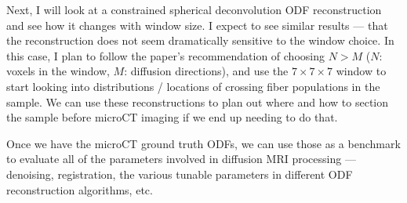 \documentclass{article}
\begin{document}
Next, I will look at a constrained spherical deconvolution ODF reconstruction
and see how it changes with window size. I expect to see similar
results --- that the reconstruction does not seem dramatically sensitive to the
window choice. In this case, I plan to follow the paper's
recommendation of choosing $N > M$ ($N$: voxels in the window, $M$: diffusion
directions), and use the $7\times 7 \times 7$ window to start looking into
distributions / locations of crossing fiber populations in the sample. We can
use these reconstructions to plan out where and how to section the sample before
microCT imaging if we end up needing to do that.

Once we have the microCT ground truth ODFs, we can use those as a benchmark to
evaluate all of the parameters involved in diffusion MRI processing --- denoising,
registration, the various tunable parameters in different ODF reconstruction
algorithms, etc. 
\end{document}
